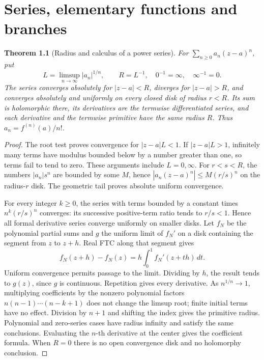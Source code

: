 \documentclass[11pt,a4paper,openany]{book}
\newtheorem{theorem}{Theorem}[chapter]
\theoremstyle{definition}
\theoremstyle{remark}\newtheorem{remark}[theorem]{Remark}
\newcommand{\dd}{\,d}\newcommand{\iu}{\mathrm i}
\newcommand{\family}[1]{}
\begin{document}

\chapter{Series, elementary functions and branches}\label{ch:d12-02}

\begin{theorem}[Radius and calculus of a power series]\family{D12.02.01}\label{d12:02-01}
For \(\sum_{n\ge0}a_n(z-a)^n\), put
\[
 L=\limsup_{n\to\infty}|a_n|^{1/n},\qquad R=L^{-1},
 \quad 0^{-1}=\infty,\quad \infty^{-1}=0.
\]
The series converges absolutely for \(|z-a|<R\), diverges for
\(|z-a|>R\), and converges absolutely and uniformly on every closed disk
of radius \(r<R\). Its sum is holomorphic there, its derivatives are the
termwise differentiated series, and each derivative and the termwise
primitive have the same radius \(R\). Thus
\(a_n=f^{(n)}(a)/n!\).
\end{theorem}
\begin{proof}
The root test proves convergence for \(|z-a|L<1\). If \(|z-a|L>1\),
infinitely many terms have modulus bounded below by a number greater than
one, so terms fail to tend to zero. These arguments include \(L=0,\infty\).
For \(r<s<R\), the numbers \(|a_n|s^n\) are bounded by some \(M\), hence
\(|a_n(z-a)^n|\le M(r/s)^n\) on the radius-\(r\) disk.
The geometric tail proves absolute uniform convergence.

For every integer \(k\ge0\), the series with terms bounded by a constant
times \(n^k(r/s)^n\) converges: its successive positive-term ratio tends to
\(r/s<1\). Hence all formal derivative series converge uniformly on smaller
disks. Let \(f_N\) be the polynomial partial sums and \(g\) the uniform
limit of \(f_N'\) on a disk containing the segment from \(z\) to \(z+h\).
Real FTC along that segment gives
\[
 f_N(z+h)-f_N(z)=h\int_0^1f_N'(z+th)\dd t.
\]
Uniform convergence permits passage to the limit. Dividing by \(h\), the
result tends to \(g(z)\), since \(g\) is continuous. Repetition gives every
derivative. As \(n^{1/n}\to1\), multiplying coefficients by the nonzero
polynomial factors \(n(n-1)\cdots(n-k+1)\) does not change the limsup root;
finite initial terms have no effect. Division by \(n+1\) and shifting the
index gives the primitive radius. Polynomial and zero-series cases have
radius infinity and satisfy the same conclusions. Evaluating the
\(n\)-th derivative at the center gives the coefficient formula.
When \(R=0\) there is no open convergence disk and no holomorphy conclusion.
\end{proof}
\end{document}
